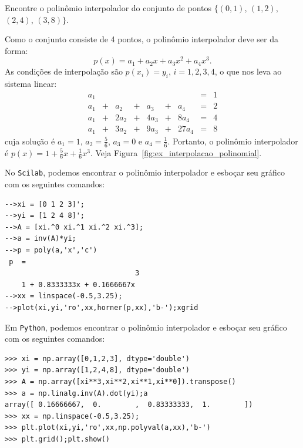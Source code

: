 \begin{ex}\label{ex:interpolacao_polinomial} Encontre o polinômio interpolador do conjunto de pontos $\{(0, 1)$, $(1, 2)$, $(2, 4)$, $(3, 8)\}$.
\end{ex}
\begin{sol}
Como o conjunto consiste de 4 pontos, o polinômio interpolador deve ser da forma:
\begin{equation*}
  p(x) = a_1 + a_2x + a_3x^2 + a_4x^3.
\end{equation*}
As condições de interpolação são $p(x_i) = y_i$, $i = 1, 2, 3, 4$, o que nos leva ao sistema linear:
\begin{equation*}
  \begin{array}{lclclclcl}
    a_1& & & & & & &=&1\\
    a_1&+& a_2&+& a_3&+&  a_4&=&2\\
    a_1&+&2a_2&+&4a_3&+& 8a_4&=&4\\
    a_1&+&3a_2&+&9a_3&+&27a_4&=&8
  \end{array}
\end{equation*}
cuja solução é $a_1=1$, $a_2=\frac{5}{6}$, $a_3=0$ e $a_4=\frac{1}{6}$. Portanto, o polinômio interpolador é $p(x)=1+\frac{5}{6}x+\frac{1}{6}x^3$. Veja Figura~\ref{fig:ex_interpolacao_polinomial}.

\ifisscilab
No \verb+Scilab+, podemos encontrar o polinômio interpolador e esboçar seu gráfico com os seguintes comandos:
\begin{verbatim}
-->xi = [0 1 2 3]';
-->yi = [1 2 4 8]'; 
-->A = [xi.^0 xi.^1 xi.^2 xi.^3]; 
-->a = inv(A)*yi; 
-->p = poly(a,'x','c') 
 p  =
                               3  
    1 + 0.8333333x + 0.1666667x   
-->xx = linspace(-0.5,3.25); 
-->plot(xi,yi,'ro',xx,horner(p,xx),'b-');xgrid
\end{verbatim}
\fi
\ifispython
Em \verb+Python+, podemos encontrar o polinômio interpolador e esboçar seu gráfico com os seguintes comandos:
\begin{verbatim}
>>> xi = np.array([0,1,2,3], dtype='double')
>>> yi = np.array([1,2,4,8], dtype='double')
>>> A = np.array([xi**3,xi**2,xi**1,xi**0]).transpose()
>>> a = np.linalg.inv(A).dot(yi);a
array([ 0.16666667,  0.        ,  0.83333333,  1.        ])
>>> xx = np.linspace(-0.5,3.25); 
>>> plt.plot(xi,yi,'ro',xx,np.polyval(a,xx),'b-')
>>> plt.grid();plt.show()
\end{verbatim}
\fi
\end{sol}


